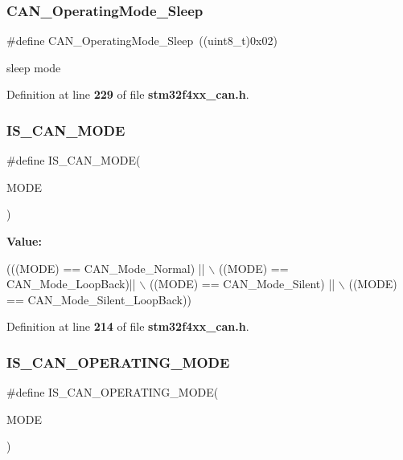 \subsubsection{C\+A\+N\+\_\+\+Operating\+Mode\+\_\+\+Sleep}
{\footnotesize\ttfamily \#define C\+A\+N\+\_\+\+Operating\+Mode\+\_\+\+Sleep~((uint8\+\_\+t)0x02)}

sleep mode 

Definition at line \textbf{ 229} of file \textbf{ stm32f4xx\+\_\+can.\+h}.

\mbox{\label{group__CAN__operating__mode_ga5d6480c240edeba383b4e07d65814d98}} 
\subsubsection{I\+S\+\_\+\+C\+A\+N\+\_\+\+M\+O\+DE}
{\footnotesize\ttfamily \#define I\+S\+\_\+\+C\+A\+N\+\_\+\+M\+O\+DE(\begin{DoxyParamCaption}\item[{}]{M\+O\+DE }\end{DoxyParamCaption})}

{\bfseries Value\+:}
\begin{DoxyCode}
(((MODE) == CAN_Mode_Normal) || \(\backslash\)
                           ((MODE) == CAN_Mode_LoopBack)|| \(\backslash\)
                           ((MODE) == CAN_Mode_Silent) || \(\backslash\)
                           ((MODE) == CAN_Mode_Silent_LoopBack))
\end{DoxyCode}


Definition at line \textbf{ 214} of file \textbf{ stm32f4xx\+\_\+can.\+h}.

\mbox{\label{group__CAN__operating__mode_ga377f1598db9b0248ba83fa6e5a75db75}} 
\subsubsection{I\+S\+\_\+\+C\+A\+N\+\_\+\+O\+P\+E\+R\+A\+T\+I\+N\+G\+\_\+\+M\+O\+DE}
{\footnotesize\ttfamily \#define I\+S\+\_\+\+C\+A\+N\+\_\+\+O\+P\+E\+R\+A\+T\+I\+N\+G\+\_\+\+M\+O\+DE(\begin{DoxyParamCaption}\item[{}]{M\+O\+DE }\end{DoxyParamCaption})}

